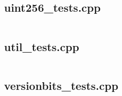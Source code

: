 \documentclass{article}
\begin{document}
\subsection{uint256\_tests.cpp}
\inputminted{cpp}{/home/dufferzafar/dev/@clones/bitcoin/src/test/uint256_tests.cpp}
\newpage

\subsection{util\_tests.cpp}
\inputminted{cpp}{/home/dufferzafar/dev/@clones/bitcoin/src/test/util_tests.cpp}
\newpage

\subsection{versionbits\_tests.cpp}
\inputminted{cpp}{/home/dufferzafar/dev/@clones/bitcoin/src/test/versionbits_tests.cpp}
\newpage






\end{document}
